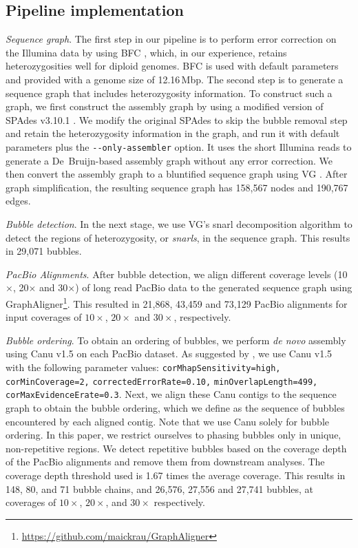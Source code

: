\subsection{Pipeline implementation}
\textit{Sequence graph}.
The first step in our pipeline is to perform error correction on the Illumina data by using BFC \citep{li2015bfc}, which, in our experience, retains heterozygosities well for diploid genomes.
BFC is used with default parameters and provided with a genome size of 12.16\,Mbp.
The second step is to generate a sequence graph that includes heterozygosity information.
To construct such a graph, we first construct the assembly graph by using a modified version of SPAdes v3.10.1 \citep{bankevich2012spades}.
We modify the original SPAdes to skip the bubble removal step and retain the heterozygosity information in the graph, and run it with default parameters plus the \texttt{{-}{-}only-assembler} option.
It uses the short Illumina reads to generate a De~Bruijn-based assembly graph without any error correction.
We then convert the assembly graph to a bluntified sequence graph using VG \citep{garrison2017sequence}.
After graph simplification, the resulting sequence graph has 158,567 nodes and 190,767 edges.

\textit{Bubble detection}. In the next stage, we use VG's snarl decomposition algorithm \citep{paten2017superbubbles} to detect the regions of heterozygosity, or \textit{snarls}, in the sequence graph. This results in 29,071 bubbles.

\textit{PacBio Alignments}. After bubble detection, we align different coverage levels (10$\times$, 20$\times$ and 30$\times$) of long read PacBio data to the generated sequence graph using GraphAligner\footnote{\url{https://github.com/maickrau/GraphAligner}}.
This resulted in 21,868, 43,459 and 73,129 PacBio alignments for input coverages of $10\times$, $20\times$ and $30\times$, respectively.

\textit{Bubble ordering}. To obtain an ordering of bubbles, we perform \textit{de novo} assembly using Canu v1.5 \citep{koren2017canu} on each PacBio dataset.
As suggested by \cite{giordano2017novo}, we use Canu v1.5 with the following parameter values: \texttt{corMhapSensitivity=high,} \texttt{corMinCoverage=2,} \texttt{correctedErrorRate=0.10,}
\texttt{minOverlapLength=499,} \texttt{corMaxEvidenceErate=0.3}.
Next, we align these Canu contigs to the sequence graph to obtain the bubble ordering, which we define as the sequence of bubbles encountered by each aligned contig.
Note that we use Canu solely for bubble ordering.
In this paper, we restrict ourselves to phasing bubbles only in unique, non-repetitive regions.
We detect repetitive bubbles based on the coverage depth of the PacBio alignments and remove them from downstream analyses.
The coverage depth threshold used is 1.67 times the average coverage.
This results in 148, 80, and 71 bubble chains, and 26,576, 27,556 and 27,741 bubbles, at coverages of $10\times$, $20\times$, and $30\times$ respectively.

